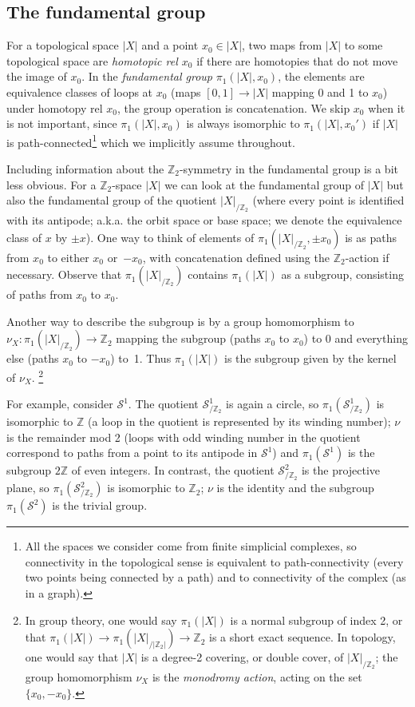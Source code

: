 \documentclass[11pt,a4paper]{scrartcl}
\numberwithin{theorem}{section}
\theoremstyle{definition}
\newcommand{\ZZ}{\mathbb{Z}}
\newcommand\Sphere{\mathcal{S}}
\begin{document}
\subsection*{The fundamental group}
For a topological space $|X|$ and a point $x_0 \in |X|$, two maps from $|X|$ to some topological space are \emph{homotopic rel $x_0$} if there are homotopies that do not move the image of $x_0$.
In the \emph{fundamental group} $\pi_1(|X|, x_0)$, the elements are equivalence classes of loops at $x_0$ (maps $[0,1] \to |X|$ mapping 0 and 1 to $x_0$) under homotopy rel $x_0$,
the group operation is concatenation.
We skip $x_0$ when it is not important, since $\pi_1(|X|,x_0)$ is always
isomorphic to $\pi_1(|X|,x_0')$ if $|X|$ is path-connected\footnote{All the spaces we consider come from finite simplicial complexes, so connectivity in the topological sense is equivalent to path-connectivity (every two points being connected by a path) and to connectivity of the complex (as in a graph).} which we implicitly assume throughout.

Including information about the $\ZZ_2$-symmetry in the fundamental group is a bit less obvious.
For a $\ZZ_2$-space $|X|$ we can look at the fundamental group of $|X|$ but also the fundamental group of the quotient $|X|_{/\ZZ_2}$ (where every point is identified with its antipode; a.k.a. the orbit space or base space; we denote the equivalence class of $x$ by $\pm x$).
One way to think of elements of $\pi_1(|X|_{/\ZZ_2}, \pm x_0)$ is as paths from $x_0$ to either $x_0$ or~$-x_0$, with concatenation defined using the $\ZZ_2$-action if necessary.
Observe that $\pi_1(|X|_{/\ZZ_2})$ contains $\pi_1(|X|)$ as a subgroup, consisting of paths from $x_0$ to $x_0$.

Another way to describe the subgroup is by a group homomorphism to $\nu_X \colon \pi_1(|X|_{/\ZZ_2}) \to \ZZ_2$ mapping the subgroup (paths $x_0$ to $x_0$) to 0 and everything else (paths $x_0$ to $-x_0$) to~1.
Thus $\pi_1(|X|)$ is the subgroup given by the kernel of $\nu_X$.%
\footnote{In group theory, one would say $\pi_1(|X|)$ is a normal subgroup of index 2, or that $\pi_1(|X|)\to \pi_1(|X|_{/|\ZZ_2|}) \to \ZZ_2$ is a short exact sequence. In topology, one would say that $|X|$ is a degree-2 covering, or double cover, of $|X|_{/\ZZ_2}$; the group homomorphism $\nu_X$ is the \emph{monodromy action}, acting on the set $\{x_0,-x_0\}$.}

For example, consider $\Sphere^1$. The quotient $\Sphere^1_{/\ZZ_2}$ is again a circle,
so $\pi_1(\Sphere^1_{/\ZZ_2})$ is isomorphic to $\ZZ$ (a loop in the quotient is represented by its winding number);
$\nu$ is the remainder mod 2 (loops with odd winding number in the quotient correspond to paths from a point to its antipode in $\Sphere^1$)
and $\pi_1(\Sphere^1)$ is the subgroup $2\ZZ$ of even integers.
In contrast, the quotient $\Sphere^2_{/\ZZ_2}$ is the projective plane, so $\pi_1(\Sphere^2_{/\ZZ_2})$ is isomorphic to $\ZZ_2$; $\nu$ is the identity and the subgroup $\pi_1(\Sphere^2)$ is the trivial group.
\end{document}
